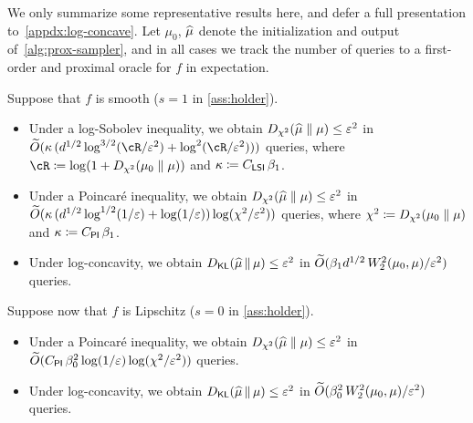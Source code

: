 We only summarize some representative results here, and defer a full presentation to~\cref{appdx:log-concave}.
Let $\mu_0$, $\widehat{\mu}$ denote the initialization and output of~\cref{alg:prox-sampler}, and in all cases we track the number of queries to a first-order and proximal oracle for $f$ in expectation.

Suppose that $f$ is smooth ($s=1$ in \cref{ass:holder}).
\begin{itemize}
    \item Under a log-Sobolev inequality, we obtain $\Dchis{\wh\mu}{\mu} \le \varepsilon^2$ in $\wt O(\kappa \,(d^{1/2} \log^{3/2}(\cR/\varepsilon^2) + \log^2(\cR/\varepsilon^2)))$ queries, where $\cR \deq \log(1+\Dchis{\mu_0}{\mu})$ and $\kappa \coloneqq C_{\mathsf{LSI}}\,\beta_1$. %
    \item Under a Poincar\'e inequality, we obtain $\Dchis{\wh\mu}{\mu} \le \varepsilon^2$ in $\widetilde{O}(\kappa\,( d^{1/2}\log^{1/2}(1/\varepsilon) + \log(1/\varepsilon)) \log(\chi^2/\varepsilon^2))$ queries, where $\chi^2 \deq \Dchis{\mu_0}{\mu}$ and $\kappa \coloneqq C_{\mathsf{PI}}\,\beta_1$.
    \item Under log-concavity, we obtain $\Dkl{\wh\mu}{\mu}\le \varepsilon^2$ in $\widetilde{O}(\beta_1 d^{1/2}\, W_2^2(\mu_0,\mu)/\varepsilon^2)$ queries. 
\end{itemize}
Suppose now that $f$ is Lipschitz ($s=0$ in \cref{ass:holder}).
\begin{itemize}
    \item Under a Poincar\'e inequality, we obtain $\Dchis{\wh\mu}{\mu} \le \varepsilon^2$ in $\widetilde{O}(C_{\mathsf{PI}} \,\beta_0^2 \log(1/\varepsilon) \log(\chi^2/\varepsilon^2))$ queries.
    \item Under log-concavity, we obtain $\Dkl{\wh\mu}{\mu}\le \varepsilon^2$ in $\widetilde{O}(\beta_0^2 \,W_2^2(\mu_0,\mu)/\varepsilon^2)$ queries.
\end{itemize}

